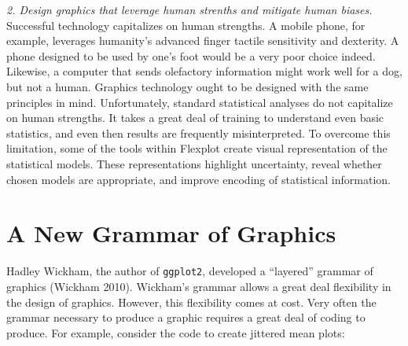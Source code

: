 \documentclass[,]{book}
\begin{document}
\emph{2. Design graphics that leverage human strenths and mitigate human
biases.} Successful technology capitalizes on human strengths. A mobile
phone, for example, leverages humanity's advanced finger tactile
sensitivity and dexterity. A phone designed to be used by one's foot
would be a very poor choice indeed. Likewise, a computer that sends
olefactory information might work well for a dog, but not a human.
Graphics technology ought to be designed with the same principles in
mind. Unfortunately, standard statistical analyses do not capitalize on
human strengths. It takes a great deal of training to understand even
basic statistics, and even then results are frequently misinterpreted.
To overcome this limitation, some of the tools within Flexplot create
visual representation of the statistical models. These representations
highlight uncertainty, reveal whether chosen models are appropriate, and
improve encoding of statistical information.

\chapter*{A New Grammar of Graphics}\label{a-new-grammar-of-graphics}

Hadley Wickham, the author of \texttt{ggplot2}, developed a ``layered''
grammar of graphics (Wickham 2010). Wickham's grammar allows a great
deal flexibility in the design of graphics. However, this flexibility
comes at cost. Very often the grammar necessary to produce a graphic
requires a great deal of coding to produce. For example, consider the
code to create jittered mean plots:
\end{document}
